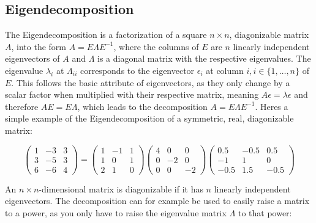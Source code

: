 \subsection{Eigendecomposition}

The Eigendecomposition is a factorization of a square $n \times n$,
diagonizable matrix $A$, into the form $A = E \Lambda E^{-1}$, where the
columns of $E$ are $n$ linearly independent eigenvectors of $A$ and
$\Lambda$ is a diagonal matrix with the respective eigenvalues. The
eigenvalue $\lambda_i$ at $\Lambda_{ii}$ corresponds to the eigenvector
$\epsilon_i$ at column $i, i \in \{1,\dots,n\}$ of $E$. This follows the
basic attribute of eigenvectors, as they only change by a scalar factor
when multiplied with their respective matrix, meaning $A \epsilon =
\lambda \epsilon$ and therefore $A E = E \Lambda$, which leads to the
decomposition $A = E \Lambda E^{-1}$. Heres a simple example of the
Eigendecomposition of a symmetric, real, diagonizable matrix:

\begin{equation}
  \begin{pmatrix}
    1 & {-3} & 3\\
    3 & {-5} & 3\\
    6 & {-6} & 4
  \end{pmatrix}
  =
  \begin{pmatrix}
    1 & {-1} & 1\\
    1 & 0 & 1\\
    2 & 1 & 0
  \end{pmatrix}
  \begin{pmatrix}
    4 & 0 & 0\\
    0 & {-2} & 0\\
    0 & 0 & {-2}
  \end{pmatrix}
  \begin{pmatrix}
    0.5 & {-0.5} & 0.5\\
    {-1} & 1 & 0\\
    {-0.5} & 1.5 & {-0.5}
  \end{pmatrix}
\end{equation}

An $n \times n$-dimensional matrix is diagonizable if it has $n$
linearly independent eigenvectors. The decomposition can for example be
used to easily raise a matrix to a power, as you only have to raise the
eigenvalue matrix $\Lambda$ to that power:

